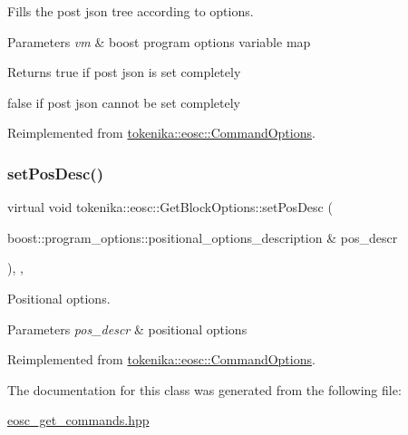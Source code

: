 Fills the post json tree according to options. 


\begin{DoxyParams}{Parameters}
{\em vm} & boost program options variable map \\
\hline
\end{DoxyParams}
\begin{DoxyReturn}{Returns}
true if post json is set completely 

false if post json cannot be set completely 
\end{DoxyReturn}


Reimplemented from \hyperlink{classtokenika_1_1eosc_1_1_command_options_a7aecc9aa79ca65f6abbd568ff8ff77a7}{tokenika\+::eosc\+::\+Command\+Options}.

\mbox{\label{classtokenika_1_1eosc_1_1_get_block_options_ac6f55ff885c6a553a16ee0b09a0d9da1}} 
\subsubsection{\texorpdfstring{set\+Pos\+Desc()}{setPosDesc()}}
{\footnotesize\ttfamily virtual void tokenika\+::eosc\+::\+Get\+Block\+Options\+::set\+Pos\+Desc (\begin{DoxyParamCaption}\item[{boost\+::program\+\_\+options\+::positional\+\_\+options\+\_\+description \&}]{pos\+\_\+descr }\end{DoxyParamCaption})\hspace{0.3cm}{\ttfamily [inline]}, {\ttfamily [protected]}, {\ttfamily [virtual]}}



Positional options. 


\begin{DoxyParams}{Parameters}
{\em pos\+\_\+descr} & positional options \\
\hline
\end{DoxyParams}


Reimplemented from \hyperlink{classtokenika_1_1eosc_1_1_command_options_ae2e98c683ae1eb3e5af1e81e60020447}{tokenika\+::eosc\+::\+Command\+Options}.



The documentation for this class was generated from the following file\+:\begin{DoxyCompactItemize}
\item 
\hyperlink{eosc__get__commands_8hpp}{eosc\+\_\+get\+\_\+commands.\+hpp}\end{DoxyCompactItemize}
